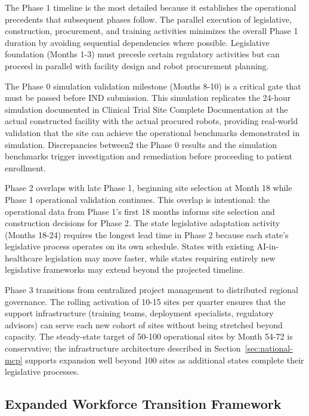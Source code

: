 The Phase 1 timeline is the most detailed because it establishes the
operational precedents that subsequent phases follow. The parallel execution
of legislative, construction, procurement, and training activities minimizes
the overall Phase 1 duration by avoiding sequential dependencies where
possible. Legislative foundation (Months 1-3) must precede certain regulatory
activities but can proceed in parallel with facility design and robot
procurement planning.

The Phase 0 simulation validation milestone (Months 8-10) is a critical gate
that must be passed before IND submission. This simulation replicates the
24-hour simulation documented in Clinical Trial Site Complete Documentation
\cite{site-docs} at the actual constructed facility with the actual procured
robots, providing real-world validation that the site can achieve the
operational benchmarks demonstrated in simulation. Discrepancies between2
the Phase 0 results and the simulation benchmarks trigger investigation and
remediation before proceeding to patient enrollment.

Phase 2 overlaps with late Phase 1, beginning site selection at Month 18
while Phase 1 operational validation continues. This overlap is intentional:
the operational data from Phase 1's first 18 months informs site selection
and construction decisions for Phase 2. The state legislative adaptation
activity (Months 18-24) requires the longest lead time in Phase 2 because
each state's legislative process operates on its own schedule. States with
existing AI-in-healthcare legislation may move faster, while states requiring
entirely new legislative frameworks may extend beyond the projected timeline.

Phase 3 transitions from centralized project management to distributed
regional governance. The rolling activation of 10-15 sites per quarter
ensures that the support infrastructure (training teams, deployment
specialists, regulatory advisors) can serve each new cohort of sites without
being stretched beyond capacity. The steady-state target of 50-100 operational
sites by Month 54-72 is conservative; the infrastructure architecture
described in Section~\ref{sec:national-mcp} supports expansion well beyond
100 sites as additional states complete their legislative processes.

\subsection{Expanded Workforce Transition Framework}
\label{subsec:impl-expanded-workforce}

